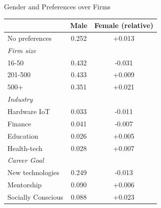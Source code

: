 \begin{frame}{Gender and Preferences over Firms}
    \begin{table}[h!]
        \footnotesize
        \begin{center}
            \label{tab:candidate_pref}
            \begin{tabular}{lcc}
                & Male & Female (relative) \\
               \hline
                No preferences & 0.252 & {+0.013} \\
                \hline
                \textcolor{frenchlilac!45!white}{\textit{Firm size}} & & \\
                16-50 & 0.432 & -0.031 \\
                201-500 & 0.433 & +0.009 \\
                500+ & 0.351 & +0.021 \\
                \hline 
                \textcolor{frenchlilac!45!white}{\textit{Industry}} & & \\
                Hardware IoT & 0.033 & -0.011 \\
                Finance & 0.041 & -0.007 \\
                Education & 0.026 & +0.005 \\
                Health-tech & 0.028 & +0.007 \\
                \hline
                \textcolor{frenchlilac!45!white}{\textit{Career Goal}} & &\\
                New technologies & 0.249 & -0.013 \\
                Mentorship & 0.090 & +0.006\\
                Socially Conscious & 0.088 & +0.023 
            \end{tabular}
        \end{center}
    \end{table}
\end{frame}


